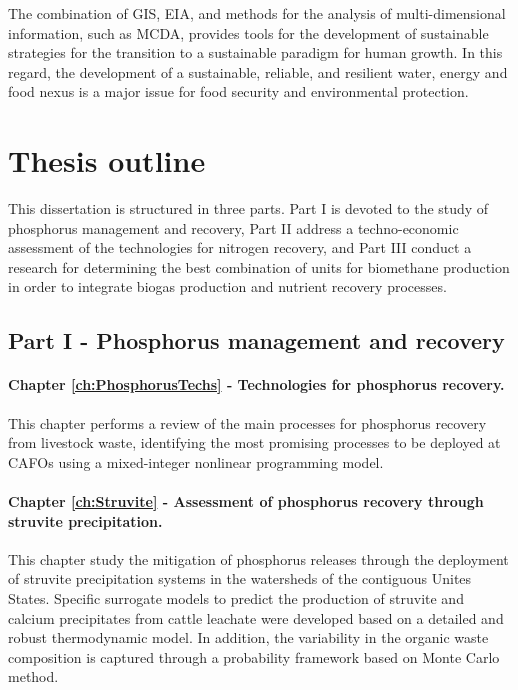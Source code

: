\begin{refsection}[referencesCh1]
The combination of GIS, EIA, and methods for the analysis of multi-dimensional information, such as MCDA, provides tools for the development of sustainable strategies for the transition to a sustainable paradigm for human growth. In this regard, the development of a sustainable, reliable, and resilient water, energy and food nexus is a major issue for food security and environmental protection.

\section{Thesis outline}
This dissertation is structured in three parts. Part I is devoted to the study of phosphorus management and recovery, Part II address a techno-economic assessment of the technologies for nitrogen recovery, and Part III conduct a research for determining the best combination of units for biomethane production in order to integrate biogas production and nutrient recovery processes.

\subsection{Part I - Phosphorus management and recovery}
\paragraph{Chapter \ref{ch:PhosphorusTechs} - Technologies for phosphorus recovery.} This chapter performs a review of the main processes for phosphorus recovery from livestock waste, identifying the most promising processes to be deployed at CAFOs using a mixed-integer nonlinear programming model.

\paragraph{Chapter \ref{ch:Struvite} - Assessment of phosphorus recovery through struvite precipitation.} This chapter study the mitigation of phosphorus releases through the deployment of struvite precipitation systems in the watersheds of the contiguous Unites States. Specific surrogate models to predict the production of struvite and calcium precipitates from cattle leachate were developed based on a detailed and robust thermodynamic model. In addition, the variability in the organic waste composition is captured through a probability framework based on Monte Carlo method.


\end{refsection}
